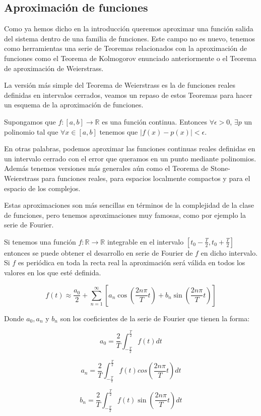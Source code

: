 \subsection{Aproximación de funciones}

Como ya hemos dicho en la introducción queremos aproximar una función salida del sistema dentro de una familia de funciones. Este campo no es nuevo, tenemos como herramientas una serie de Teoremas relacionados con la aproximación de funciones como el Teorema de Kolmogorov enunciado anteriormente o el Teorema de aproximación de Weierstrass.

La versión más simple del Teorema de Weierstrass es la de funciones reales definidas en intervalos cerrados, veamos un repaso de estos Teoremas para hacer un esquema de la aproximación de funciones.

\begin{teorema}
	Supongamos que $f:[a,b] \rightarrow \mathbb{R}$ es una función continua. Entonces $\forall \epsilon >0$, $\exists p$ un polinomio tal que $\forall x\in [a,b]$ tenemos que $|f(x)-p(x)|<\epsilon$.
\end{teorema}

En otras palabras, podemos aproximar las funciones continuas reales definidas en un intervalo cerrado con el error que queramos en un punto mediante polinomios. Además tenemos versiones más generales aún como el Teorema de Stone-Weierstrass para funciones reales, para espacios localmente compactos y para el espacio de los complejos.

Estas aproximaciones son más sencillas en términos de la complejidad de la clase de funciones, pero tenemos aproximaciones muy famosas, como por ejemplo la serie de Fourier.

\begin{definicion}
	Si tenemos una función $f:\mathbb{R} \rightarrow \mathbb{R}$ integrable en el intervalo $[t_0 - \frac{T}{2}, t_0 + \frac{T}{2}]$ entonces se puede obtener el desarrollo en serie de Fourier de $f$ en dicho intervalo. Si $f$ es periódica en toda la recta real la aproximación será válida en todos los valores en los que esté definida.
	
	$$f(t) \approx \frac{a_0}{2} + \sum_{n=1}^{\infty}[a_n \cos (\frac{2n\pi}{T}t) + b_n\sin (\frac{2n\pi}{T}t)]$$
	
	Donde $a_0, a_n$ y $b_n$ son los coeficientes de la serie de Fourier que tienen la forma:
	
	$$a_0 = \frac{2}{T}\int_{-\frac{T}{2}}^{\frac{T}{2}}f(t)dt$$
	
	$$a_n = \frac{2}{T}\int_{-\frac{T}{2}}^{\frac{T}{2}}f(t) cos(\frac{2n\pi}{T}t)dt$$
	
	$$b_n = \frac{2}{T}\int_{-\frac{T}{2}}^{\frac{T}{2}}f(t) \sin (\frac{2n\pi}{T}t)dt$$
\end{definicion}

